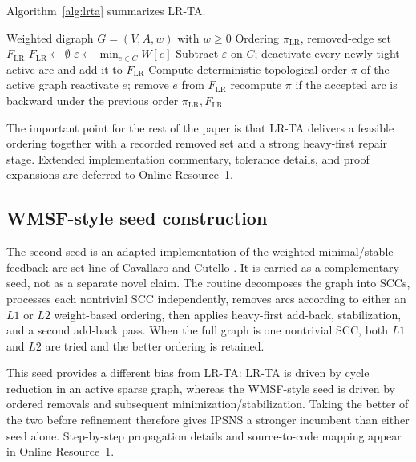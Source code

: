 Algorithm~\ref{alg:lrta} summarizes LR-TA.

\begin{algorithm}[t]
\caption{LR-TA seed construction}
\label{alg:lrta}
\footnotesize
\begin{algorithmic}[1]
\Require Weighted digraph \(G=(V,A,w)\) with \(w\ge 0\)
\Ensure Ordering \(\pi_{\mathrm{LR}}\), removed-edge set \(F_{\mathrm{LR}}\)
\State \(F_{\mathrm{LR}} \gets \emptyset\)
    \State \(\varepsilon \gets \min_{e\in C} W[e]\)
    \State Subtract \(\varepsilon\) on \(C\); deactivate every newly tight active arc and add it to \(F_{\mathrm{LR}}\)
\EndWhile
\State Compute deterministic topological order \(\pi\) of the active graph
        \State reactivate \(e\); remove \(e\) from \(F_{\mathrm{LR}}\)
        \State recompute \(\pi\) if the accepted arc is backward under the previous order
    \EndIf
\EndFor
\State \Return \(\pi_{\mathrm{LR}}, F_{\mathrm{LR}}\)
\end{algorithmic}
\end{algorithm}

The important point for the rest of the paper is that LR-TA delivers a feasible ordering together with a recorded removed set and a strong heavy-first repair stage. Extended implementation commentary, tolerance details, and proof expansions are deferred to Online Resource~1.

\subsection{WMSF-style seed construction}
\label{subsec:wmsf}

The second seed is an adapted implementation of the weighted minimal/stable feedback arc set line of Cavallaro and Cutello \cite{CC25}. It is carried as a complementary seed, not as a separate novel claim. The routine decomposes the graph into SCCs, processes each nontrivial SCC independently, removes arcs according to either an \(L1\) or \(L2\) weight-based ordering, then applies heavy-first add-back, stabilization, and a second add-back pass. When the full graph is one nontrivial SCC, both \(L1\) and \(L2\) are tried and the better ordering is retained.

This seed provides a different bias from LR-TA: LR-TA is driven by cycle reduction in an active sparse graph, whereas the WMSF-style seed is driven by ordered removals and subsequent minimization/stabilization. Taking the better of the two before refinement therefore gives IPSNS a stronger incumbent than either seed alone. Step-by-step propagation details and source-to-code mapping appear in Online Resource~1.

